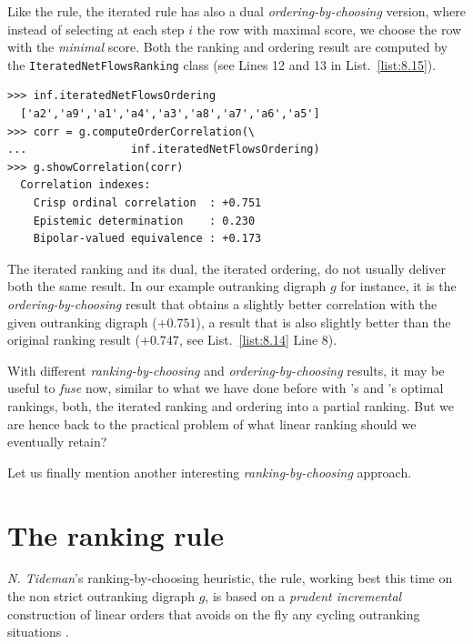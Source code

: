 Like the \Kohler rule, the iterated \NetFlows rule has also a dual \emph{ordering-by-choosing} version, where instead of selecting at each step $i$ the row with maximal \NetFlows score, we choose the row with the \emph{minimal} \NetFlows score. Both the ranking and ordering result are computed by the \texttt{IteratedNetFlowsRanking} class (see Lines 12 and 13 in List.~\vref{list:8.15}).
\begin{lstlisting}
>>> inf.iteratedNetFlowsOrdering
  ['a2','a9','a1','a4','a3','a8','a7','a6','a5']
>>> corr = g.computeOrderCorrelation(\
...                inf.iteratedNetFlowsOrdering)
>>> g.showCorrelation(corr)
  Correlation indexes:
    Crisp ordinal correlation  : +0.751
    Epistemic determination    : 0.230
    Bipolar-valued equivalence : +0.173
\end{lstlisting}

The iterated \NetFlows ranking and its dual, the iterated \NetFlows ordering, do not usually deliver both the same result. In our example outranking digraph $g$ for instance, it is the \emph{ordering-by-choosing} result that obtains a slightly better correlation with the given outranking digraph ($+0.751$), a result that is also slightly better than the original \Kohler ranking result ($+0.747$, see List.~\vref{list:8.14} Line 8).

With different \emph{ranking-by-choosing} and \emph{ordering-by-choosing} results, it may be useful to \emph{fuse} now, similar to what we have done before with \Kemeny 's and \Slater 's optimal rankings, both, the iterated \NetFlows ranking and ordering into a partial ranking. But we are hence back to the practical problem of what linear ranking should we eventually retain? 

Let us finally mention another interesting \emph{ranking-by-choosing} approach.

\section{The \RankedPairs ranking rule}
\label{sec:8.7}

\emph{N. Tideman}'s  ranking-by-choosing heuristic, the \RankedPairs rule, working best this time on the non strict outranking digraph $g$, is based on a \emph{prudent incremental} construction of linear orders that avoids on the fly any cycling outranking situations \citep{TID-1987}.

